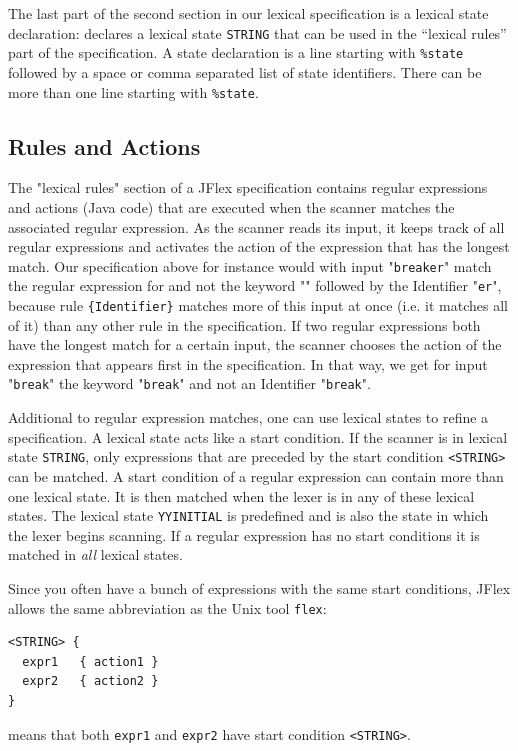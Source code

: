 \documentclass[11pt]{scrartcl}
\newcommand{\trit}{\em}
\begin{document}
The last part of the second section in our
lexical specification is a lexical state declaration: 
\texttt{}
declares a lexical state \texttt{STRING} that can be
used in the ``lexical rules'' part of the specification. A state declaration
is a line starting with \texttt{\%state} followed by a space or comma
separated list of state identifiers. There can be more than one line starting
with \texttt{\%state}.

\subsection{Rules and Actions\label{ExampleLexRules}}
The "lexical rules" section of a JFlex specification contains regular expressions
and actions (Java code) that are executed when the scanner matches the
associated regular expression. As the scanner reads its input, it keeps
track of all regular expressions and activates the action of the expression
that has the longest match. Our specification above for instance would with input
"\texttt{breaker}" match the regular expression for \texttt{}
and not the keyword "\texttt{}"
followed by the Identifier "\texttt{er}", because rule \verb+{Identifier}+
matches more of this input at once (i.e. it matches all of it)
than any other rule in the specification. If two regular expressions both 
have the longest match for a certain input, the scanner chooses the action 
of the expression that appears first in the specification. In that way, we 
get for input "\texttt{break}" the keyword "\texttt{break}" and not an 
Identifier "\texttt{break}". 

Additional to regular expression matches, one can use lexical states to
refine a specification. A lexical state acts like a start condition.
If the scanner is in lexical state \texttt{STRING}, only expressions that
are preceded by the start condition \texttt{<STRING>} can be matched.
A start condition of a regular expression can contain more than one lexical
state. It is then matched when the lexer is in any of these lexical states.
The lexical state \texttt{YYINITIAL} is predefined and is also the state
in which the lexer begins scanning. If a regular expression has no start
conditions it is matched in {\trit all} lexical states.
\label{ExampleRulesStateBunch}

Since you often have a bunch of expressions with the same start conditions, 
JFlex allows the same abbreviation as the Unix tool \texttt{flex}:
\begin{verbatim}
<STRING> {
  expr1   { action1 }
  expr2   { action2 }
}
\end{verbatim}
means that both \texttt{expr1} and \texttt{expr2} have start condition \texttt{<STRING>}.
\label{ExampleRulesYYINITIAL}
\end{document}
